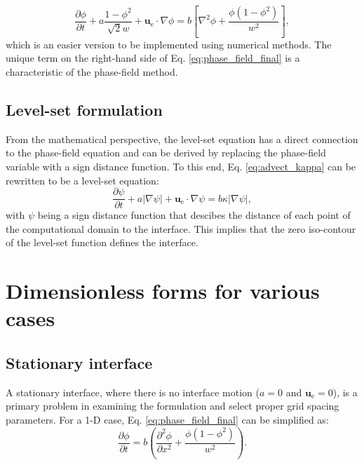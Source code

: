 \begin{equation} \label{eq:phase_field_final}
\frac{\partial \phi}{\partial t}+a \frac{1-\phi^{2}}{\sqrt{2} w}+\boldsymbol{u}_{\mathrm{e}} \cdot \nabla \phi=b\left[\nabla^{2} \phi+\frac{\phi\left(1-\phi^{2}\right)}{w^{2}}\right],
\end{equation}
which is an easier version to be implemented using numerical methods. The unique term on the right-hand side of Eq. \ref{eq:phase_field_final} is a characteristic of the phase-field method.

\subsection{Level-set formulation}

From the mathematical perspective, the level-set equation has a direct connection to the phase-field equation and can be derived by replacing the phase-field variable with a sign distance function. To this end, Eq. \ref{eq:advect_kappa} can be rewritten to be a level-set equation:
\begin{equation} \label{eq:ls_general}
\frac{\partial \psi}{\partial t}+a|\nabla \psi|+\boldsymbol{u}_{\mathrm{e}} \cdot \nabla \psi=b \kappa|\nabla \psi|,
\end{equation}
with $\psi$ being a sign distance function that descibes the distance of each point of the computational domain to the interface. This implies that the zero iso-contour of the level-set function defines the interface.

\section{Dimensionless forms for various cases}

\subsection{Stationary interface}

A stationary interface, where there is no interface motion ($a=0$ and $\boldsymbol{u}_{\mathrm{e}}=0$), is a primary problem in examining the formulation and select proper grid spacing parameters. For a 1-D case, Eq. \ref{eq:phase_field_final} can be simplified as:
\begin{equation} \label{eq:stationary_general}
\frac{\partial \phi}{\partial t}=b\left(\frac{\partial^{2} \phi}{\partial x^{2}}+\frac{\phi\left(1-\phi^{2}\right)}{w^{2}}\right).
\end{equation}

